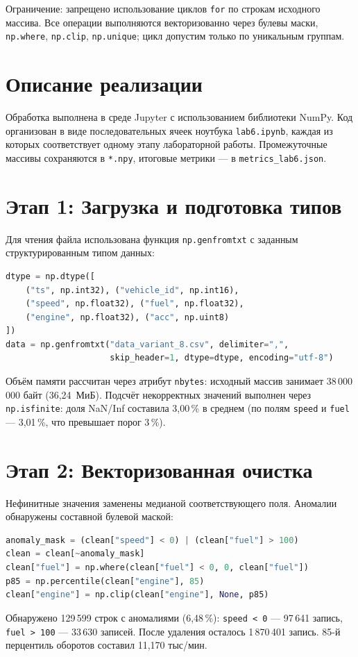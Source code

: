 \documentclass[oneside,a4paper,14pt]{extarticle}
\begin{document}
Ограничение: запрещено использование циклов \texttt{for} по строкам исходного массива. Все операции выполняются векторизованно через булевы маски, \texttt{np.where}, \texttt{np.clip}, \texttt{np.unique}; цикл допустим только по уникальным группам.

\section*{Описание реализации}
Обработка выполнена в среде Jupyter с использованием библиотеки NumPy. Код организован в виде последовательных ячеек ноутбука \texttt{lab6.ipynb}, каждая из которых соответствует одному этапу лабораторной работы. Промежуточные массивы сохраняются в \texttt{*.npy}, итоговые метрики --- в \texttt{metrics\_lab6.json}.

\section*{Этап 1: Загрузка и подготовка типов}
Для чтения файла использована функция \texttt{np.genfromtxt} с заданным структурированным типом данных:
\begin{lstlisting}[language=Python]
dtype = np.dtype([
    ("ts", np.int32), ("vehicle_id", np.int16),
    ("speed", np.float32), ("fuel", np.float32),
    ("engine", np.float32), ("acc", np.uint8)
])
data = np.genfromtxt("data_variant_8.csv", delimiter=",",
                     skip_header=1, dtype=dtype, encoding="utf-8")
\end{lstlisting}
Объём памяти рассчитан через атрибут \texttt{nbytes}: исходный массив занимает 38\,000\,000 байт (36,24~МиБ). Подсчёт некорректных значений выполнен через \texttt{np.isfinite}: доля NaN/Inf составила 3,00\,\% в среднем (по полям \texttt{speed} и \texttt{fuel} --- 3,01\,\%, что превышает порог 3\,\%).

\section*{Этап 2: Векторизованная очистка}
Нефинитные значения заменены медианой соответствующего поля. Аномалии обнаружены составной булевой маской:
\begin{lstlisting}[language=Python]
anomaly_mask = (clean["speed"] < 0) | (clean["fuel"] > 100)
clean = clean[~anomaly_mask]
clean["fuel"] = np.where(clean["fuel"] < 0, 0, clean["fuel"])
p85 = np.percentile(clean["engine"], 85)
clean["engine"] = np.clip(clean["engine"], None, p85)
\end{lstlisting}
Обнаружено 129\,599 строк с аномалиями (6,48\,\%): \texttt{speed < 0} --- 97\,641 запись, \texttt{fuel > 100} --- 33\,630 записей. После удаления осталось 1\,870\,401 запись. 85-й перцентиль оборотов составил 11,170 тыс/мин.
\end{document}
